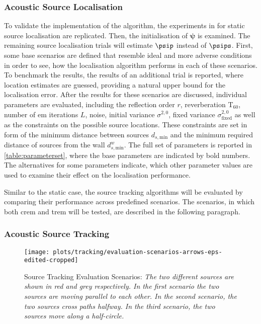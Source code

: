\subsubsection*{Acoustic Source Localisation}
\label{sec:evalScenariosLoc}
To validate the implementation of the algorithm, the experiments in \cite{Schwartz2014} for static source localisation are replicated. Then, the initialisation of $\bm\psi$ is examined. The remaining source localisation trials will estimate $\psip$ instead of $\psips$. First, some base scenarios are defined that resemble ideal and more adverse conditions in order to see, how the localisation algorithm performs in each of these scenarios. To benchmark the results, the results of an additional trial is reported, where location estimates are guessed, providing a natural upper bound for the localisation error. After the results for these scenarios are discussed, individual parameters are evaluated, including the reflection order $r$, reverberation T$_{60}$, number of \gls{em} iterations $L$, noise, initial variance $\sigma^{2,\text{0}}$, fixed variance $\sigma^{2,\text{0}}_{\text{fixed}}$ as well as the constraints on the possible source locations. These constraints are set in form of the minimum distance between sources $d_{s,\text{min}}$ and the minimum required distance of sources from the wall $d^w_{s,\text{min}}$. The full set of parameters is reported in \autoref{table:parameterset}, where the base parameters are indicated by bold numbers. The alternatives for some parameters indicate, which other parameter values are used to examine their effect on the localisation performance.


Similar to the static case, the source tracking algorithms will be evaluated by comparing their performance across predefined scenarios. The scenarios, in which both \gls{crem} and \gls{trem} will be tested, are described in the following paragraph.



\subsubsection*{Acoustic Source Tracking}
\label{sec:evalScenariosTracking}

\begin{figure}[H]
    \setlength\figureheight{4cm}
    \setlength\figurewidth{\textwidth}
    \texttt{[image: plots/tracking/evaluation-scenarios-arrows-eps-edited-cropped]}
    
    \caption[Source Tracking Evaluation Scenarios]{Source Tracking Evaluation Scenarios: \itshape The two different sources are shown in red and grey respectively. In the first scenario the two sources are moving parallel to each other. In the second scenario, the two sources cross paths halfway. In the third scenario, the two sources move along a half-circle.}
    \label{fig:evalScenariosTracking}
\end{figure}

